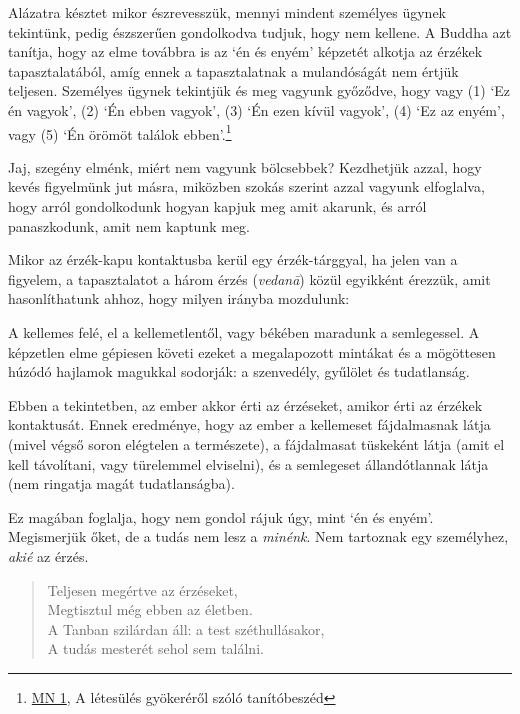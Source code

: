Alázatra késztet mikor észrevesszük, mennyi mindent személyes ügynek
tekintünk, pedig észszerűen gondolkodva tudjuk, hogy nem kellene. A
Buddha azt tanítja, hogy az elme továbbra is az `én és enyém' képzetét
alkotja az érzékek tapasztalatából, amíg ennek a tapasztalatnak a
mulandóságát nem értjük teljesen. Személyes ügynek tekintjük és meg
vagyunk győződve, hogy vagy (1) `Ez én vagyok', (2) `Én ebben vagyok',
(3) `Én ezen kívül vagyok', (4) `Ez az enyém', vagy (5) `Én örömöt
találok ebben'.\footnote{\href{https://a-buddha-ujja.hu/mn-1/hu/pressing-lajos}{MN
  1}, A létesülés gyökeréről szóló tanítóbeszéd}

Jaj, szegény elménk, miért nem vagyunk bölcsebbek? Kezdhetjük azzal,
hogy kevés figyelmünk jut másra, miközben szokás szerint azzal vagyunk
elfoglalva, hogy arról gondolkodunk hogyan kapjuk meg amit akarunk, és
arról panaszkodunk, amit nem kaptunk meg.

Mikor az érzék-kapu kontaktusba kerül egy érzék-tárggyal, ha jelen van a
figyelem, a tapasztalatot a három érzés (\emph{vedanā}) közül egyikként
érezzük, amit hasonlíthatunk ahhoz, hogy milyen irányba mozdulunk:

A kellemes felé, el a kellemetlentől, vagy békében maradunk a
semlegessel. A képzetlen elme gépiesen követi ezeket a megalapozott
mintákat és a mögöttesen húzódó hajlamok magukkal sodorják: a
szenvedély, gyűlölet és tudatlanság.

Ebben a tekintetben, az ember akkor érti az érzéseket, amikor érti az
érzékek kontaktusát. Ennek eredménye, hogy az ember a kellemeset
fájdalmasnak látja (mivel végső soron elégtelen a természete), a
fájdalmasat tüskeként látja (amit el kell távolítani, vagy türelemmel
elviselni), és a semlegeset állandótlannak látja (nem ringatja magát
tudatlanságba).

Ez magában foglalja, hogy nem gondol rájuk úgy, mint `én és enyém'.
Megismerjük őket, de a tudás nem lesz a \emph{minénk}. Nem tartoznak egy
személyhez, \emph{akié} az érzés.

\begin{quote}
Teljesen megértve az érzéseket,\\
Megtisztul még ebben az életben.\\
A Tanban szilárdan áll: a test széthullásakor,\\
A tudás mesterét sehol sem találni.

\bigskip

\end{quote}

